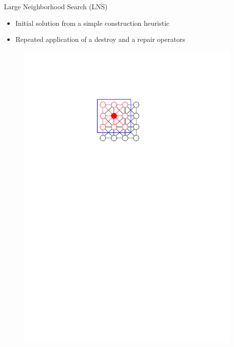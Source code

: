 \documentclass[aspectratio=1610]{beamer}
\newcommand{\important}[1]{{\color{green!60!black}#1}}
\begin{document}
\begin{frame}{Large Neighborhood Search (LNS)}
	\begin{itemize}
		\item Initial solution from a simple construction heuristic
		\item Repeated application of a \important{destroy} and a \important{repair} operators
	\end{itemize}
	\begin{figure}
		\begin{overprint}
			\centering\includegraphics[width=\textwidth, page=10]{figures/graphics.pdf}

\end{overprint}
\end{figure}
\end{frame}
\end{document}
